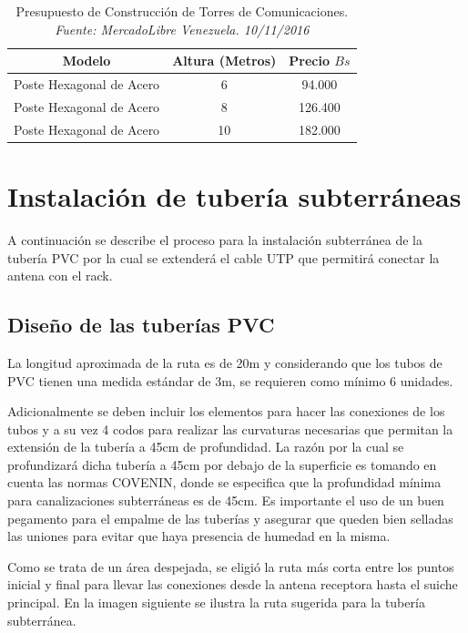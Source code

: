 \documentclass[11pt, a4paper, twosides]{report}
\begin{document}
\begin{table}[h]
    \centering
    \begin{tabular}{|c|c|c|}
        \hline
       \cellcolor{gray75} \textbf{Modelo} & \cellcolor{gray75}\textbf{Altura (Metros)} & \cellcolor{gray75}\textbf{Precio $Bs$} \\ \hline
        Poste Hexagonal de Acero & 6 & 94.000 \\ \hline
        Poste Hexagonal de Acero & 8 & 126.400  \\ \hline
        Poste Hexagonal de Acero & 10 & 182.000  \\ \hline
    \end{tabular}
    \caption{Presupuesto de Construcción de Torres de Comunicaciones.
     \textit{Fuente: MercadoLibre Venezuela. 10/11/2016}}
     \label{tab:costorre}
\end{table}

\section{Instalación de tubería subterráneas}
 A continuación se describe el proceso para la instalación subterránea de la tubería PVC por la cual se extenderá el cable UTP que permitirá conectar la antena con el rack.
 
\subsection{Diseño de las tuberías PVC}
La longitud aproximada de la ruta es de 20m y considerando que los tubos de PVC tienen una medida estándar de 3m, se requieren como mínimo 6 unidades.
 
Adicionalmente se deben incluir los elementos para hacer las conexiones de los tubos y a su vez 4 codos para realizar las curvaturas necesarias que permitan la extensión de la tubería a 45cm de profundidad. La razón por la cual se profundizará dicha tubería a 45cm por debajo de la superficie es tomando en cuenta las normas COVENIN, donde se especifica que la profundidad mínima para canalizaciones subterráneas es de 45cm. Es importante el uso de un buen pegamento para el empalme de las tuberías y asegurar que queden bien selladas las uniones para evitar que haya presencia de humedad en la misma.

 Como se trata de un área despejada, se eligió la ruta más corta entre los puntos inicial y final para llevar las conexiones desde la antena receptora hasta el suiche principal. En la imagen siguiente se ilustra la ruta sugerida para la tubería subterránea.
\end{document}
